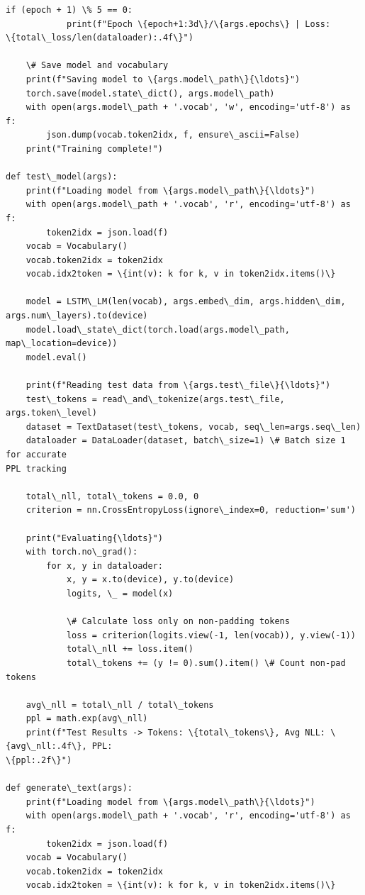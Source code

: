 \documentclass[11pt]{article}
\begin{document}
\begin{Verbatim}[commandchars=\\\{\}]
        if (epoch + 1) \% 5 == 0:
            print(f"Epoch \{epoch+1:3d\}/\{args.epochs\} | Loss:
\{total\_loss/len(dataloader):.4f\}")

    \# Save model and vocabulary
    print(f"Saving model to \{args.model\_path\}{\ldots}")
    torch.save(model.state\_dict(), args.model\_path)
    with open(args.model\_path + '.vocab', 'w', encoding='utf-8') as f:
        json.dump(vocab.token2idx, f, ensure\_ascii=False)
    print("Training complete!")

def test\_model(args):
    print(f"Loading model from \{args.model\_path\}{\ldots}")
    with open(args.model\_path + '.vocab', 'r', encoding='utf-8') as f:
        token2idx = json.load(f)
    vocab = Vocabulary()
    vocab.token2idx = token2idx
    vocab.idx2token = \{int(v): k for k, v in token2idx.items()\}

    model = LSTM\_LM(len(vocab), args.embed\_dim, args.hidden\_dim,
args.num\_layers).to(device)
    model.load\_state\_dict(torch.load(args.model\_path, map\_location=device))
    model.eval()

    print(f"Reading test data from \{args.test\_file\}{\ldots}")
    test\_tokens = read\_and\_tokenize(args.test\_file, args.token\_level)
    dataset = TextDataset(test\_tokens, vocab, seq\_len=args.seq\_len)
    dataloader = DataLoader(dataset, batch\_size=1) \# Batch size 1 for accurate
PPL tracking

    total\_nll, total\_tokens = 0.0, 0
    criterion = nn.CrossEntropyLoss(ignore\_index=0, reduction='sum')

    print("Evaluating{\ldots}")
    with torch.no\_grad():
        for x, y in dataloader:
            x, y = x.to(device), y.to(device)
            logits, \_ = model(x)

            \# Calculate loss only on non-padding tokens
            loss = criterion(logits.view(-1, len(vocab)), y.view(-1))
            total\_nll += loss.item()
            total\_tokens += (y != 0).sum().item() \# Count non-pad tokens

    avg\_nll = total\_nll / total\_tokens
    ppl = math.exp(avg\_nll)
    print(f"Test Results -> Tokens: \{total\_tokens\}, Avg NLL: \{avg\_nll:.4f\}, PPL:
\{ppl:.2f\}")

def generate\_text(args):
    print(f"Loading model from \{args.model\_path\}{\ldots}")
    with open(args.model\_path + '.vocab', 'r', encoding='utf-8') as f:
        token2idx = json.load(f)
    vocab = Vocabulary()
    vocab.token2idx = token2idx
    vocab.idx2token = \{int(v): k for k, v in token2idx.items()\}


\end{Verbatim}
\end{document}
